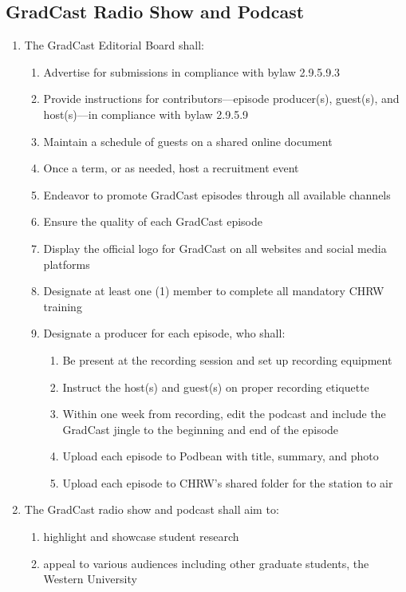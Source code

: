 \subsection{GradCast Radio Show and Podcast}
\begin{enumerate} [label*=\arabic*., align=left]	
\item The GradCast Editorial Board shall:
\begin{enumerate}
\item Advertise for submissions in compliance with bylaw 2.9.5.9.3
\item Provide instructions for contributors––episode producer(s), guest(s), and host(s)––in
compliance with bylaw 2.9.5.9
\item Maintain a schedule of guests on a shared online document
\item Once a term, or as needed, host a recruitment event
\item Endeavor to promote GradCast episodes through all available channels
\item Ensure the quality of each GradCast episode
\item Display the official logo for GradCast on all websites and social media platforms
\item Designate at least one (1) member to complete all mandatory CHRW training
\item Designate a producer for each episode, who shall:
\begin{enumerate}
\item Be present at the recording session and set up recording equipment
\item Instruct the host(s) and guest(s) on proper recording etiquette
\item Within one week from recording, edit the podcast and include the GradCast jingle to the beginning and end of the episode
\item Upload each episode to Podbean with title, summary, and photo
\item Upload each episode to CHRW’s shared folder for the station to air
\end{enumerate}
\end{enumerate}
\item The GradCast radio show and podcast shall aim to:
\begin{enumerate}
\item highlight and showcase student research
\item appeal to various audiences including other graduate students, the Western University

\end{enumerate}
\end{enumerate}
